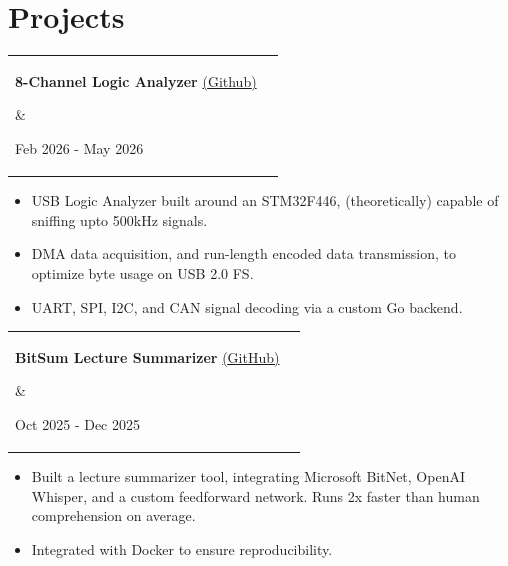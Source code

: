 \documentclass{article}
\begin{document}
\section{Projects} \vspace{4pt}
    \raggedright\begin{tabular}{lr}
        \parbox[l]{3.65in}{{\bf{\large{8-Channel Logic Analyzer}}} \href{https://github.com/ragusauce4357/ECE692-Final-Project}{(\underline{Github})}} &
        \parbox[r]{3.65in}{\raggedleft Feb 2026 - May 2026} \\
    \end{tabular}
    \begin{itemize} \vspace{-5pt}
        \setlength{\itemsep}{-2pt}
		\item USB Logic Analyzer built around an STM32F446, (theoretically) capable of sniffing upto 500kHz signals.
        \item DMA data acquisition, and run-length encoded data transmission, to optimize byte usage on USB 2.0 FS.
        \item UART, SPI, I2C, and CAN signal decoding via a custom Go backend.
    \end{itemize}

    \raggedright\begin{tabular}{lr}
        \parbox[l]{3.65in}{{\bf{\large{BitSum Lecture Summarizer}}} \href{https://github.com/avr34/ECE381-Final}{(\underline{GitHub})}} &
        \parbox[r]{3.65in}{\raggedleft Oct 2025 - Dec 2025} \\
    \end{tabular}
    \begin{itemize} \vspace{-5pt}
        \setlength{\itemsep}{-2pt}
        \item Built a lecture summarizer tool, integrating Microsoft BitNet, OpenAI Whisper, and a custom feedforward network. Runs 2x faster than human comprehension on average.
        \item Integrated with Docker to ensure reproducibility.
    \end{itemize}
\end{document}
